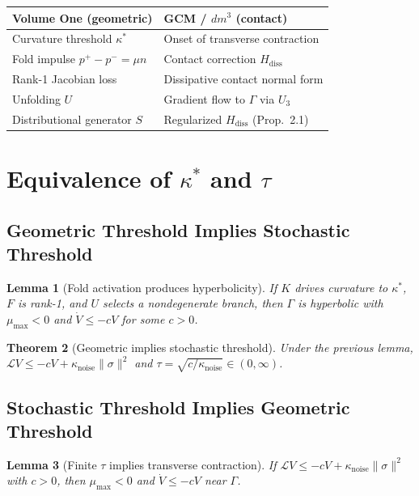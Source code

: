 \documentclass[11pt]{article}
\theoremstyle{boxed}
\newtheorem{theorem}{Theorem}[section]
\newtheorem{lemma}[theorem]{Lemma}
\begin{document}
\begin{center}
\begin{tabular}{ll}
\toprule
\textbf{Volume One (geometric)} & \textbf{GCM / $dm^3$ (contact)}\\
\midrule
Curvature threshold $\kappa^{*}$ & Onset of transverse contraction\\
Fold impulse $p^{+} - p^{-} = \mu n$ & Contact correction $H_{\mathrm{diss}}$\\
Rank-1 Jacobian loss & Dissipative contact normal form\\
Unfolding $U$ & Gradient flow to $\Gamma$ via $U_3$ \cite{GCM}\\
Distributional generator $S$ & Regularized $H_{\mathrm{diss}}$ (Prop.~2.1)\\
\bottomrule
\end{tabular}
\end{center}

\section{Equivalence of $\kappa^{*}$ and $\tau$}

\subsection{Geometric Threshold Implies Stochastic Threshold}

\begin{lemma}[Fold activation produces hyperbolicity]
If $K$ drives curvature to $\kappa^{*}$, $F$ is rank-1, and $U$ selects a
nondegenerate branch, then $\Gamma$ is hyperbolic with $\mu_{\max} < 0$ and
$\dot{V} \leq -cV$ for some $c > 0$.
\end{lemma}

\begin{theorem}[Geometric implies stochastic threshold]
Under the previous lemma, $\mathcal{L}V \leq -cV + \kappa_{\mathrm{noise}}\|\sigma\|^{2}$
and $\tau = \sqrt{c/\kappa_{\mathrm{noise}}} \in (0,\infty)$.
\end{theorem}

\subsection{Stochastic Threshold Implies Geometric Threshold}

\begin{lemma}[Finite $\tau$ implies transverse contraction]
If $\mathcal{L}V \leq -cV + \kappa_{\mathrm{noise}}\|\sigma\|^{2}$ with $c > 0$, then
$\mu_{\max} < 0$ and $\dot{V} \leq -cV$ near $\Gamma$.
\end{lemma}
\end{document}
